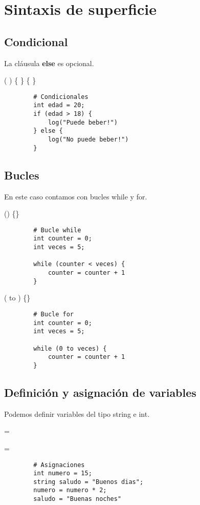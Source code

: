 \documentclass{article}
\begin{document}
    \section{Sintaxis de superficie}
    \subsection{Condicional}
    La cláusula \textbf{else} es opcional. \par
    \begin{center}
         (  ) 
        \{  \}  \{  \}
    \end{center}
    \begin{lstlisting}
        # Condicionales
        int edad = 20;
        if (edad > 18) {
            log("Puede beber!")
        } else {
            log("No puede beber!")
        }
    \end{lstlisting}
    \subsection{Bucles}
    En este caso contamos con bucles while y for.\par
    \begin{center}
         () \{\}
    \end{center}
    \begin{lstlisting}
        # Bucle while
        int counter = 0;
        int veces = 5;
        
        while (counter < veces) {
            counter = counter + 1
        }

    \end{lstlisting}
    \begin{center}
         ( to ) \{\}
    \end{center}
    \begin{lstlisting}
        # Bucle for
        int counter = 0;
        int veces = 5;
        
        while (0 to veces) {
            counter = counter + 1
        }

    \end{lstlisting}
    \newpage
    \subsection{Definición y asignación de variables}
    Podemos definir variables del tipo string e int.\par
    \begin{center}
          = 
    \end{center}
    \begin{center}
          = 
    \end{center}
    \begin{lstlisting}
        # Asignaciones
        int numero = 15;
        string saludo = "Buenos dias";
        numero = numero * 2;
        saludo = "Buenas noches"
    \end{lstlisting}
\end{document}
